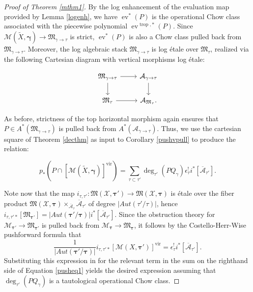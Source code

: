 \documentclass[12pt, oneside]{amsart}   	%
\newcounter{thm}
\newcommand{\vir}{\operatorname{vir}}
\newcommand{\ev}{\operatorname{ev}}
\newcommand{\trop}{\operatorname{trop}}
\numberwithin{equation}{section}
\numberwithin{thm}{section}
\numberwithin{figure}{section}
\begin{document}
\begin{proof}[Proof of Theorem \ref{mthm1}]
By the log enhancement of the evaluation map provided by Lemma \ref{logenh}, we have $\ev^*(P)$ is the operational Chow class associated with the piecewise polynomial $\ev^{\trop,*}(P)$. Since $\mathscr{M}(\widetilde{X},\pmb\gamma)\rightarrow \mathfrak{M}_{\gamma\rightarrow \tau}$ is strict, $\ev^*(P)$ is also a Chow class pulled back from $\mathfrak{M}_{\gamma\rightarrow \tau}$. Moreover, the log algebraic stack $\mathfrak{M}_{\gamma\rightarrow \tau}$ is log \'etale over $\mathfrak{M}_{\tau}$, realized via the following Cartesian diagram with vertical morphisms log \'etale:

\begin{equation}
\begin{tikzcd}
\mathfrak{M}_{\gamma\rightarrow \tau} \arrow{r}\arrow{d} & \mathcal{A}_{\gamma\rightarrow \tau}\arrow{d}\\
\mathfrak{M}_{\tau} \arrow{r} & \mathcal{A}_{\mathfrak{M}_{\tau}}.
\end{tikzcd}
\end{equation}

As before, strictness of the top horizontal morphism again ensures that $P \in A^*(\mathfrak{M}_{\gamma\rightarrow \tau})$ is pulled back from $A^*(\mathcal{A}_{\gamma\rightarrow \tau})$. Thus, we use the cartesian square of Theorem \ref{decthm} as input to Corollary \ref{pushvpull} to produce the relation:

\begin{equation}\label{pusheq1}
p_*(P\cap[\mathscr{M}(\widetilde{X},\pmb\gamma)]^{\vir}) = \sum_{\tau\subset \tau'} \deg_{\tau'}(PQ_{\gamma})\epsilon_{\tau}^!i^*[\overline{\mathcal{A}}_{\tau'}].
\end{equation}

Note now that the map $i_{\tau,\tau'}: \mathfrak{M}(\mathcal{X},\pmb\tau') \rightarrow \mathfrak{M}(\mathcal{X},\pmb\tau)$ is \'etale over the fiber product $\mathfrak{M}(\mathcal{X},\pmb\tau)\times_{\overline{\mathcal{A}}_{\tau}} \overline{\mathcal{A}}_{\tau'}$ of degree $|Aut(\tau'/\tau)|$, hence $i_{\tau,\tau'*}[\mathfrak{M}_{\pmb\tau'}] = |Aut(\pmb\tau'/\pmb\tau)|i^*[\overline{\mathcal{A}}_{\tau'}]$. Since the obstruction theory for $\mathscr{M}_{\pmb\tau'} \rightarrow \mathfrak{M}_{\pmb\tau'}$ is pulled back from $\mathscr{M}_{\pmb\tau} \rightarrow \mathfrak{M}_{\pmb\tau}$, it follows by the Costello-Herr-Wise pushforward formula \cite{pusherr} that $$\frac{1}{|Aut(\pmb\tau'/\pmb\tau)|}i_{\tau,\tau'*}[\mathscr{M}(X,\pmb\tau')]^{\vir} =\epsilon^!_{\tau}i^*[\overline{\mathcal{A}}_{\tau'}].$$ Substituting this expression in for the relevant term in the sum on the righthand side of Equation \ref{pusheq1} yields the desired expression assuming that $\deg_{\tau'}(PQ_{\gamma})$ is a tautological operational Chow class. 


\end{proof}
\end{document}
